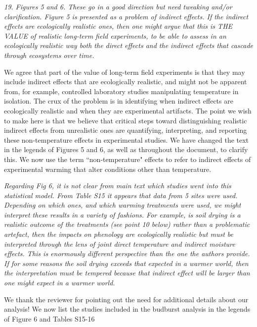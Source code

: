 \documentclass[11pt,a4paper]{letter}
\begin{document}
\begin{letter}{}
\emph{19. Figures 5 and 6. These go in a good direction but need tweaking and/or clarification. Figure 5 is presented as a
problem of indirect effects. If the indirect effects are ecologically realistic ones, then one might
argue that this is THE VALUE of realistic long-term field experiments, to be able to assess in an
ecologically realistic way both the direct effects and the indirect effects that cascade through
ecosystems over time.}

We agree that part of the value of long-term field experiments is that they may include indirect effects that are ecologically realistic, and might not be apparent from, for example, controlled laboratory studies manipulating temperature in isolation. The crux of the problem is in identifying when indirect effects are ecologically realistic and when they are experimental artifacts. The point we wish to make here is that we believe that critical steps toward distinguishing realistic indirect effects from unrealistic ones are quantifying, interpreting, and reporting these non-temperature effects in experimental studies. We have changed the text in the legends of Figures 5 and 6, as well as throughout the document, to clarify this. We now use the term ``non-temperature" effects to refer to indirect effects of experimental warming that alter conditions other than temperature. 

\emph{Regarding Fig 6, it is not clear from main text which studies went into this statistical model. From Table S15 it appears that data from 5 sites were used. Depending on which ones, and which warming treatments were used, we might interpret these results in a variety of fashions. For example, is soil drying is a realistic outcome of the treatments (see point 10 below) rather than a problematic artefact, then the impacts on phenology are ecologically realistic but must be interpreted through the lens of joint direct temperature and indirect moisture effects. This is enormously different perspective than the one the authors provide. If for some reasons the soil drying exceeds that expected in a warmer world, then the interpretation must be tempered because that indirect effect will be larger than one might expect in a warmer world.}

We thank the reviewer for pointing out the need for additional details about our analysis! We now list the studies included in the budburst analysis in the legends of Figure 6 and Tables S15-16


\end{letter}
\end{document}
